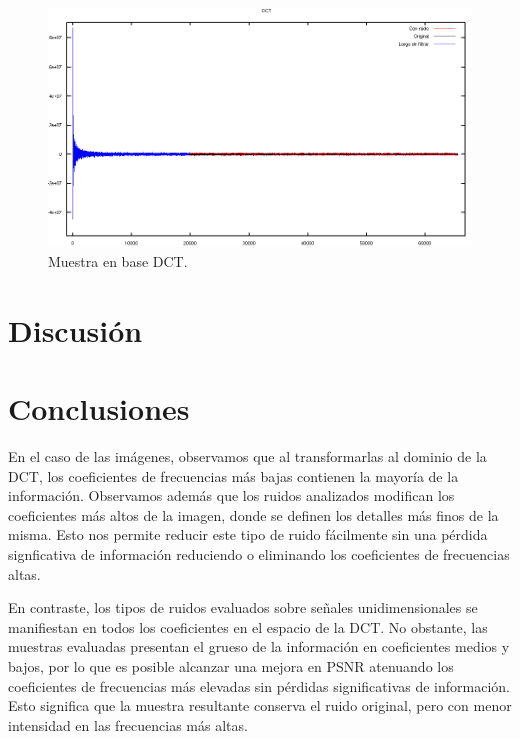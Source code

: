 \documentclass[a4paper,10pt,twoside]{article}
\begin{document}
\begin{figure}[H]
  \centering
  \includegraphics[width=15cm]{graficos/lena_impulsivo_umbralizar_dct.png} 
  \caption{Muestra en base DCT.}
\end{figure}


\section{Discusión}




\section{Conclusiones}

En el caso de las imágenes, observamos que al transformarlas al dominio de la DCT, los coeficientes de frecuencias más bajas contienen la mayoría de la información. Observamos además que los ruidos analizados modifican los coeficientes más altos de la imagen, donde se definen los detalles más finos de la misma. Esto nos permite reducir este tipo de ruido fácilmente sin una pérdida signficativa de información reduciendo o eliminando los coeficientes de frecuencias altas.

En contraste, los tipos de ruidos evaluados sobre señales unidimensionales se manifiestan en todos los coeficientes en el espacio de la DCT. No obstante, las muestras evaluadas presentan el grueso de la información en coeficientes medios y bajos, por lo que es posible alcanzar una mejora en PSNR atenuando los coeficientes de frecuencias más elevadas sin pérdidas significativas de información. Esto significa que la muestra resultante conserva el ruido original, pero con menor intensidad en las frecuencias más altas.
\end{document}
